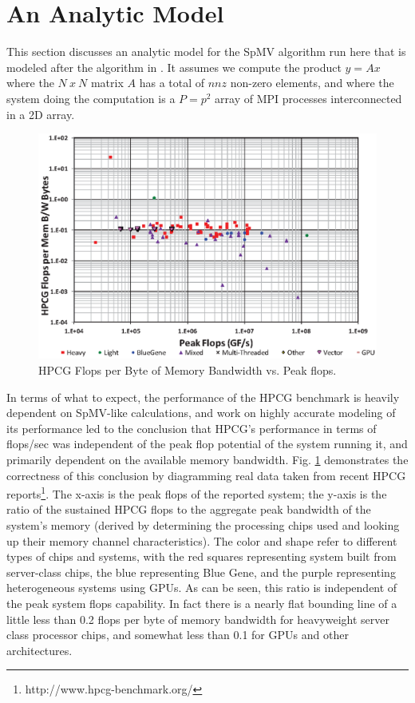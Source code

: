 \section{An Analytic Model}\label{sec:dspmv-analytic}

This section discusses an analytic model for the SpMV algorithm run here that is modeled after the algorithm in \cite{techbib:6933066}. It assumes we compute the product $y=Ax$ where the $N~x~N$ matrix $A$ has a total of $nnz$ non-zero elements,  and where the system doing the computation is a $P=p^2$ array of MPI processes interconnected in a 2D array.

\begin{figure}\begin{centering}
\includegraphics[scale=0.80]{figures/spmv-historical-hpcg-bw.eps}
\caption{HPCG Flops per Byte of Memory Bandwidth vs. Peak flops.}
\label{fig:spmv-historical-hpcg-bw}
\end{centering}\end{figure}


In terms of what to expect, the performance of the HPCG benchmark \cite{techbib:hpcg-snl-dongarra} is heavily dependent on SpMV-like calculations, and work on highly accurate modeling of its performance \cite{techbib:marjanovic2014performance} led to the conclusion that HPCG's performance in terms of flops/sec was independent of the peak flop potential of the system running it, and primarily dependent on the available memory bandwidth. Fig. \ref{fig:spmv-historical-hpcg-bw} demonstrates the correctness of this conclusion by diagramming real data taken from recent HPCG reports\footnote{http://www.hpcg-benchmark.org/}. The x-axis is the peak flops of the reported system; the y-axis is the ratio of the sustained HPCG flops to the aggregate peak bandwidth of the system's memory (derived by determining the processing chips used and looking up their memory channel characteristics). The color and shape refer to different types of chips and systems, with the red squares representing system built from server-class chips, the blue representing Blue Gene, and the purple representing heterogeneous systems using GPUs. As can be seen, this ratio is independent of the peak system flops capability. In fact there is a nearly flat bounding line of a little less than 0.2 flops per byte of memory bandwidth for heavyweight server class processor chips, and somewhat less than 0.1 for GPUs and other architectures.


